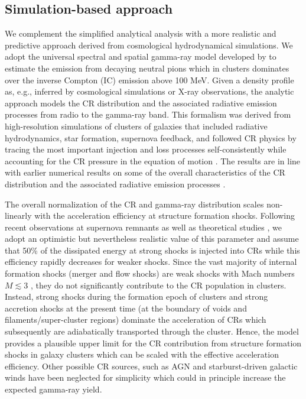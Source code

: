 \documentclass[12pt,manuscript]{aastex}
\begin{document}
%
%

\subsection{Simulation-based approach}
\label{sec:simulation}
We complement the simplified analytical analysis with a more realistic and predictive approach
derived from cosmological hydrodynamical simulations. We adopt the universal spectral and spatial
gamma-ray model developed by \citet{article:PinzkePfrommer:2010} to estimate the emission from
decaying neutral pions which in clusters dominates over the inverse Compton (IC) emission above
100 MeV. Given a density profile as, e.g., inferred by
cosmological simulations or X-ray observations, the analytic approach models the CR distribution and
the associated radiative emission processes from radio to the gamma-ray band. This formalism was
derived from high-resolution simulations of clusters of galaxies that included radiative hydrodynamics,
star formation, supernova feedback, and followed CR physics by tracing the most important injection
and loss processes self-consistently while accounting for the CR pressure in the equation of motion
\citep{article:PfrommerSpringelEnsslinJubelgas, article:EnsslinPfrommerSpringelJubelgas:2007,
  article:JubelgasSpringelEnsslinPfrommer:2008}. The results are in line with earlier numerical
results on some of the overall characteristics of the CR distribution and the associated radiative
emission processes \citep{article:DolagEnsslin:2000, article:MiniatiRyuKangJones:2001,
  article:Miniati:2003, article:Pfrommer_etal:2007, article:PfrommerEnsslinSpringel:2008,
  article:Pfrommer:2008}.
 
The overall normalization of the CR and gamma-ray distribution scales non-linearly with the
acceleration efficiency at structure formation shocks. Following recent observations at supernova
remnants \citep{article:Helder_etal:2009} as well as theoretical studies
\citep{article:KangJones:2005}, we adopt an optimistic but nevertheless realistic value of this
parameter and assume that 50\% of the dissipated energy at strong shocks is injected into CRs while
this efficiency rapidly decreases for weaker shocks. Since the vast majority of internal formation
shocks (merger and flow shocks) are weak shocks with Mach numbers $M\lesssim3$
\citep[e.g.,][]{article:Ryu_etal:2003}, they do not significantly contribute to the CR population in
clusters. Instead, strong shocks during the formation epoch of clusters and strong accretion shocks
at the present time (at the boundary of voids and filaments/super-cluster regions) dominate the
acceleration of CRs which subsequently are adiabatically transported through the cluster. Hence, the
model provides a plausible upper limit for the CR contribution from structure formation shocks in
galaxy clusters which can be scaled with the effective acceleration efficiency. Other possible CR
sources, such as AGN and starburst-driven galactic winds have been neglected for simplicity which
could in principle increase the expected gamma-ray yield.
\end{document}
